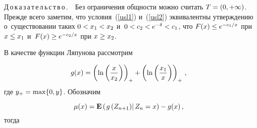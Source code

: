 \begin{multicols}{2}
\columnbreak


\noindent
Д\,о\,к\,а\,з\,а\,т\,е\,л\,ь\,с\,т\,в\,о\,.\ \
Без ограничения общ\-ности мож\-но считать
$T\hm=(0,+\infty)$. Прежде всего заметим, что условия~(\ref{usl1}) 
и~(\ref{usl2}) эквивалентны утверж\-де\-нию о~существовании
таких $0\hm<x_1\hm<x_2$ и~$0\hm<c_2\hm<e^{-\delta}\hm<c_1$, что $F(x)\hm\le
e^{-c_1/x}$ при $x\hm\le x_1$ и~$F(x)\hm\ge e^{-c_2/x}$ при $x\hm\ge x_2$.

В качестве функции Ляпунова рас\-смот\-рим 

\noindent
$$
g(x)=\left(\ln\left(\displaystyle\frac{\displaystyle x\mathstrut}{\displaystyle x_2\mathstrut}\right)\right)_+ +\left(\ln\left(\displaystyle\frac{\displaystyle x_1\mathstrut}{\displaystyle x\mathstrut}\right)\right)_+\,,
$$
где $y_+\hm=\max\{0,y\}$. Обозначим 

\noindent
$$
\mu(x)={\bf E}\left(\left.g\left(Z_{n+1}\right)\right\vert Z_n=x\right)-g(x)\,,
$$
тогда

\vspace*{-6pt}


\end{multicols}

